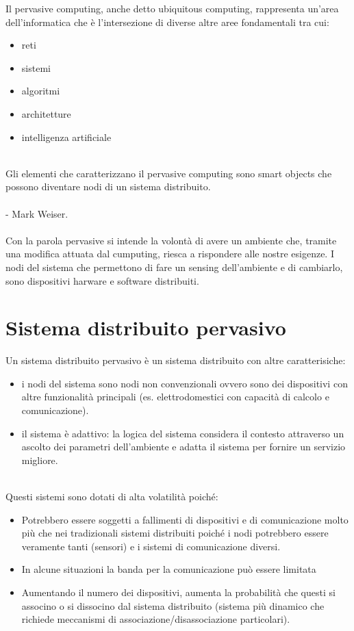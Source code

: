 Il pervasive computing, anche detto ubiquitous computing, rappresenta un'area dell'informatica che è l'intersezione di diverse altre aree fondamentali tra cui:
\begin{itemize}
    \item reti
    \item sistemi
    \item algoritmi
    \item architetture
    \item intelligenza artificiale
\end{itemize}
\phantom \\

Gli elementi che caratterizzano il pervasive computing sono smart objects che possono diventare nodi di un sistema distribuito.
\\
\\
 - Mark Weiser.\\\\
Con la parola pervasive si intende la volontà di avere un ambiente che, tramite una modifica attuata dal cumputing, riesca a rispondere alle nostre esigenze. I nodi del sistema che permettono di fare un sensing dell'ambiente e di cambiarlo, sono dispositivi harware e software distribuiti.

\newpage
\section{Sistema distribuito pervasivo}
Un sistema distribuito pervasivo è un sistema distribuito con altre caratterisiche:

\begin{itemize}
    \item i nodi del sistema sono nodi non convenzionali ovvero sono dei dispositivi con altre funzionalità principali (es. elettrodomestici con capacità di calcolo e comunicazione).
    \item il sistema è adattivo:  la logica del sistema considera il contesto attraverso un ascolto dei parametri dell'ambiente e adatta il sistema per fornire un servizio migliore.
\end{itemize}

\phantom \\

Questi sistemi sono dotati di alta volatilità poiché:
\begin{itemize}
    \item Potrebbero essere soggetti a fallimenti di dispositivi e di comunicazione molto più che nei tradizionali sistemi distribuiti poiché i nodi potrebbero essere veramente tanti (sensori) e i sistemi di comunicazione diversi.
    \item In alcune situazioni la banda per la comunicazione può essere limitata
    \item Aumentando il numero dei dispositivi, aumenta la probabilità che questi si associno o si dissocino dal sistema distribuito (sistema più dinamico che richiede meccanismi di associazione/disassociazione particolari).
\end{itemize}

